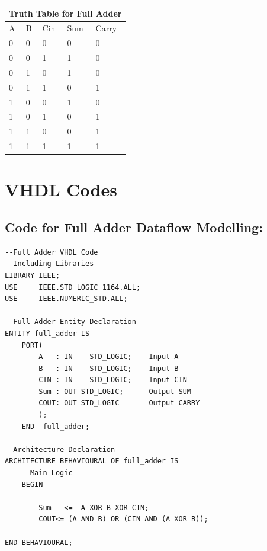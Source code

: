 \documentclass[12pt,singleside,a4paper]{article}
\begin{document}
\begin{center}
\begin{tabular}{ |p{1cm}|p{1cm}|p{1cm}|p{1cm}|p{1cm}|  } \hline
 \multicolumn{5}{|c|}{Truth Table for Full Adder}   \\ \hline \hline
    A   &   B   &  Cin  &  Sum  &   Carry           \\ \hline
    0   &   0   &   0   &   0   &   0               \\\hline
    0   &   0   &   1   &   1   &   0               \\\hline
    0   &   1   &   0   &   1   &   0               \\\hline
    0   &   1   &   1   &   0   &   1               \\\hline
    1   &   0   &   0   &   1   &   0               \\\hline
    1   &   0   &   1   &   0   &   1               \\\hline
    1   &   1   &   0   &   0   &   1               \\\hline
    1   &   1   &   1   &   1   &   1               \\\hline

\end{tabular} 
\end{center}




\section{VHDL Codes}
\subsection{Code for Full Adder Dataflow Modelling:}
\begin{lstlisting}[style=VHDL, frame=single,linewidth = 18cm]
--Full Adder VHDL Code
--Including Libraries
LIBRARY IEEE;
USE 	IEEE.STD_LOGIC_1164.ALL;
USE 	IEEE.NUMERIC_STD.ALL;

--Full Adder Entity Declaration
ENTITY full_adder IS
	PORT(
		A 	: IN 	STD_LOGIC;  --Input A
		B 	: IN 	STD_LOGIC;  --Input B
		CIN	: IN 	STD_LOGIC;  --Input CIN			
		Sum : OUT STD_LOGIC;    --Output SUM
		COUT: OUT STD_LOGIC     --Output CARRY
		);
	END  full_adder;
	
--Architecture Declaration	
ARCHITECTURE BEHAVIOURAL OF full_adder IS
	--Main Logic
	BEGIN
		
		Sum   <=  A XOR B XOR CIN;
		COUT<= (A AND B) OR (CIN AND (A XOR B));
			
END BEHAVIOURAL;

\end{lstlisting}
\end{document}
